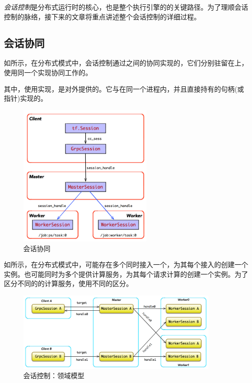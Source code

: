 \begin{content}

\emph{会话控制}是\tf{}分布式运行时的核心，也是整个\tf{}执行引擎的的关键路径。为了理顺会话控制的脉络，接下来的文章将重点讲述整个会话控制的详细过程。


\subsection{会话协同}

如所示，在分布式模式中，会话控制通过之间的协同实现的，它们分别驻留在上，使用同一个实现协同工作的。

其中，使用实现，是\tf{}对外提供的。它与在同一个进程内，并且直接持有的句柄(或指针)实现的。

\begin{figure}[H]
\centering
\includegraphics[width=0.6\textwidth]{figures/dist-session-overview-1.png}
\caption{会话协同}
 \label{fig:dist-session-overview}
\end{figure}

如所示，在分布式模式中，可能存在多个同时接入一个，为其每个接入的创建一个实例。也可能同时为多个提供计算服务，为其每个请求计算的创建一个实例。为了区分不同的的计算服务，使用不同的区分。

\begin{figure}[H]
\centering
\includegraphics[width=0.9\textwidth]{figures/dist-multi-client-conn.png}
\caption{会话控制：领域模型}
 \label{fig:dist-multi-client-conn}
\end{figure}


\end{content}
